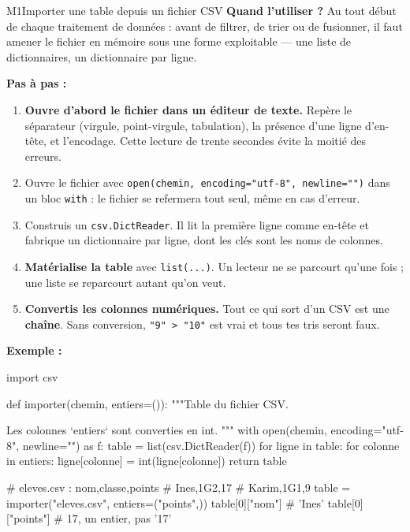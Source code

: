 \begin{fichemethode}{M1}{Importer une table depuis un fichier CSV}
\textbf{Quand l'utiliser ?} Au tout début de chaque traitement de données : avant de
filtrer, de trier ou de fusionner, il faut amener le fichier en mémoire sous une forme
exploitable — une liste de dictionnaires, un dictionnaire par ligne.

\textbf{Pas à pas :}
\begin{enumerate}
  \item \textbf{Ouvre d'abord le fichier dans un éditeur de texte.} Repère le séparateur
    (virgule, point-virgule, tabulation), la présence d'une ligne d'en-tête, et l'encodage.
    Cette lecture de trente secondes évite la moitié des erreurs.
  \item Ouvre le fichier avec \lstinline{open(chemin, encoding="utf-8", newline="")} dans un
    bloc \lstinline{with} : le fichier se refermera tout seul, même en cas d'erreur.
  \item Construis un \lstinline{csv.DictReader}. Il lit la première ligne comme en-tête et
    fabrique un dictionnaire par ligne, dont les clés sont les noms de colonnes.
  \item \textbf{Matérialise la table} avec \lstinline{list(...)}. Un lecteur ne se parcourt
    qu'une fois ; une liste se reparcourt autant qu'on veut.
  \item \textbf{Convertis les colonnes numériques.} Tout ce qui sort d'un CSV est une
    \textbf{chaîne}. Sans conversion, \lstinline{"9" > "10"} est vrai et tous tes tris
    seront faux.
\end{enumerate}

\textbf{Exemple :}
\begin{python}
import csv

def importer(chemin, entiers=()):
    """Table du fichier CSV.

    Les colonnes `entiers` sont converties en int.
    """
    with open(chemin, encoding="utf-8", newline="") as f:
        table = list(csv.DictReader(f))
    for ligne in table:
        for colonne in entiers:
            ligne[colonne] = int(ligne[colonne])
    return table

# eleves.csv :  nom,classe,points
#               Ines,1G2,17
#               Karim,1G1,9
table = importer("eleves.csv", entiers=("points",))
table[0]["nom"]       # 'Ines'
table[0]["points"]    # 17, un entier, pas '17'
\end{python}


\end{fichemethode}
